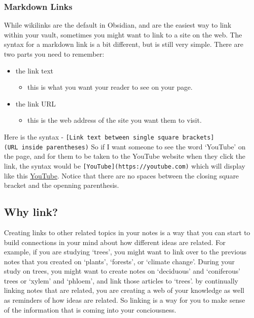 \documentclass[
]{book}
\providecommand{\tightlist}{%
  \setlength{\itemsep}{0pt}\setlength{\parskip}{0pt}}
\theoremstyle{definition}
\theoremstyle{definition}
\theoremstyle{definition}
\theoremstyle{definition}
\theoremstyle{remark}
\begin{document}
\hypertarget{markdown-links}{%
\subsubsection*{Markdown Links}\label{markdown-links}}

While wikilinks are the default in Obsidian, and are the easiest way to link within your vault, sometimes you might want to link to a site on the web. The syntax for a markdown link is a bit different, but is still very simple. There are two parts you need to remember:

\begin{itemize}
\tightlist
\item
  the link text

  \begin{itemize}
  \tightlist
  \item
    this is what you want your reader to see on your page.
  \end{itemize}
\item
  the link URL

  \begin{itemize}
  \tightlist
  \item
    this is the web address of the site you want them to visit.
  \end{itemize}
\end{itemize}

Here is the syntax - \texttt{{[}Link\ text\ between\ single\ square\ brackets{]}(URL\ inside\ parentheses)} So if I want someone to see the word `YouTube' on the page, and for them to be taken to the YouTube website when they click the link, the syntax would be \texttt{{[}YouTube{]}(https://youtube.com)} which will display like this \href{https://youtube.com}{YouTube}. Notice that there are no spaces between the closing square bracket and the openning parenthesis.

\hypertarget{why-link}{%
\subsection*{Why link?}\label{why-link}}

Creating links to other related topics in your notes is a way that you can start to build connections in your mind about how different ideas are related. For example, if you are studying `trees', you might want to link over to the previous notes that you created on `plants', `forests', or `climate change'. During your study on trees, you might want to create notes on `deciduous' and `coniferous' trees or `xylem' and `phloem', and link those articles to `trees'. by continually linking notes that are related, you are creating a web of your knowledge as well as reminders of how ideas are related. So linking is a way for you to make sense of the information that is coming into your conciousness.
\end{document}
